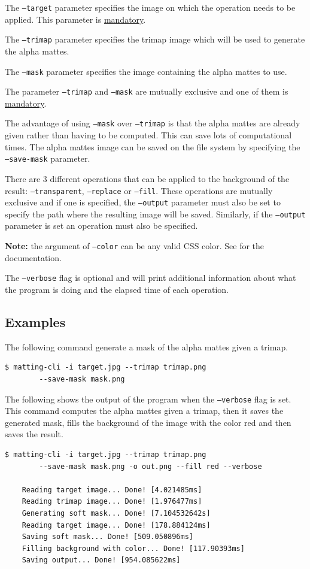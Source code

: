 \documentclass[a4paper]{article}
\begin{document}
The \texttt{--target} parameter specifies the image
on which the operation needs to be applied.
This parameter is \underline{mandatory}.

The \texttt{--trimap} parameter specifies the trimap
image which will be used to generate the alpha mattes.

The \texttt{--mask} parameter specifies the image
containing the alpha mattes to use.

The parameter \texttt{--trimap} and \texttt{--mask}
are mutually exclusive and one of them is \underline{mandatory}.

The advantage of using \texttt{--mask} over
\texttt{--trimap} is that the alpha mattes are
already given rather than having to be computed.
This can save lots of computational times.
The alpha mattes image can be saved on the file system
by specifying the \texttt{--save-mask} parameter.

There are 3 different operations that can be applied
to the background of the result: \texttt{--transparent},
\texttt{--replace} or \texttt{--fill}.
These operations are mutually exclusive and if one is specified,
the \texttt{--output} parameter must also be set to
specify the path where the resulting image will be saved.
Similarly, if the \texttt{--output} parameter is set
an operation must also be specified.

\textbf{Note:} the argument of \texttt{--color} can be any valid
CSS color. See \cite{csscolors} for the documentation.

The \texttt{--verbose} flag is optional and will print additional
information about what the program is doing and the elapsed
time of each operation.

\subsection{Examples}

The following command generate a mask of the alpha mattes
given a trimap.
\begin{lstlisting}[style=boxed]
    $ matting-cli -i target.jpg --trimap trimap.png
        --save-mask mask.png
\end{lstlisting}

%

The following shows the output of the program when the \texttt{--verbose}
flag is set. This command computes the alpha mattes given a trimap,
then it saves the generated mask, fills the background of the image
with the color red and then saves the result.
\begin{lstlisting}[style=boxed]
    $ matting-cli -i target.jpg --trimap trimap.png
        --save-mask mask.png -o out.png --fill red --verbose
    
    Reading target image... Done! [4.021485ms]
    Reading trimap image... Done! [1.976477ms]
    Generating soft mask... Done! [7.104532642s]
    Reading target image... Done! [178.884124ms]
    Saving soft mask... Done! [509.050896ms]
    Filling background with color... Done! [117.90393ms]
    Saving output... Done! [954.085622ms]
\end{lstlisting}
\end{document}
